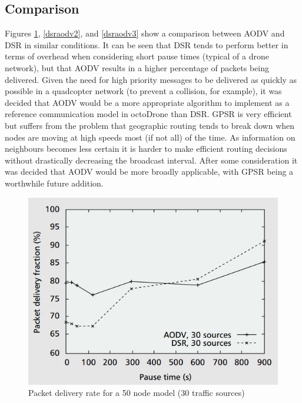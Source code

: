 \subsection{Comparison}
Figures \ref{dsraodv1}, \ref{dsraodv2}, and \ref{dsraodv3} show a comparison between AODV and DSR in similar conditions. It can be seen that DSR tends to perform better in terms of overhead when considering short pause times (typical of a drone network), but that AODV results in a higher percentage of packets being delivered. Given the need for high priority messages to be delivered as quickly as possible in a quadcopter network (to prevent a collision, for example), it was decided that AODV would be a more appropriate algorithm to implement as a reference communication model in octoDrone than DSR. GPSR is very efficient but suffers from the problem that geographic routing tends to break down when nodes are moving at high speeds most (if not all) of the time. As information on neighbours becomes less certain it is harder to make efficient routing decisions without drastically decreasing the broadcast interval. After some consideration it was decided that AODV would be more broadly applicable, with GPSR being a worthwhile future addition.

\begin{figure}
\centering	
\includegraphics[scale=0.7]{img/comp1}
\caption{Packet delivery rate for a 50 node model (30 traffic sources)\cite{perkins2001performance}}
\label{dsraodv1}
\end{figure}
	
